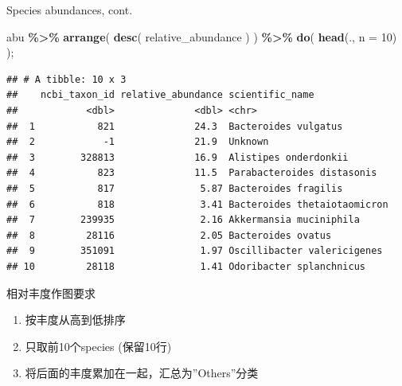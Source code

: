 \documentclass[ignorenonframetext,]{beamer}
\newenvironment{Shaded}{\begin{snugshade}}{\end{snugshade}}
\newcommand{\AttributeTok}[1]{\textcolor[rgb]{0.13,0.29,0.53}{#1}}
\newcommand{\DecValTok}[1]{\textcolor[rgb]{0.00,0.00,0.81}{#1}}
\newcommand{\FunctionTok}[1]{\textcolor[rgb]{0.13,0.29,0.53}{\textbf{#1}}}
\newcommand{\NormalTok}[1]{#1}
\newcommand{\SpecialCharTok}[1]{\textcolor[rgb]{0.81,0.36,0.00}{\textbf{#1}}}
\providecommand{\tightlist}{%
  \setlength{\itemsep}{0pt}\setlength{\parskip}{0pt}}
\newcommand\FontSmall{\fontsize{7}{8}\selectfont}
\begin{document}
\begin{frame}[fragile]{Species abundances, cont.}
\protect\hypertarget{species-abundances-cont.}{}
\FontSmall

\begin{Shaded}
\begin{Highlighting}[]
\NormalTok{abu }\SpecialCharTok{\%\textgreater{}\%} \FunctionTok{arrange}\NormalTok{( }\FunctionTok{desc}\NormalTok{( relative\_abundance ) ) }\SpecialCharTok{\%\textgreater{}\%} \FunctionTok{do}\NormalTok{( }\FunctionTok{head}\NormalTok{(., }\AttributeTok{n =} \DecValTok{10}\NormalTok{) );}
\end{Highlighting}
\end{Shaded}

\begin{verbatim}
## # A tibble: 10 x 3
##    ncbi_taxon_id relative_abundance scientific_name             
##            <dbl>              <dbl> <chr>                       
##  1           821              24.3  Bacteroides vulgatus        
##  2            -1              21.9  Unknown                     
##  3        328813              16.9  Alistipes onderdonkii       
##  4           823              11.5  Parabacteroides distasonis  
##  5           817               5.87 Bacteroides fragilis        
##  6           818               3.41 Bacteroides thetaiotaomicron
##  7        239935               2.16 Akkermansia muciniphila     
##  8         28116               2.05 Bacteroides ovatus          
##  9        351091               1.97 Oscillibacter valericigenes 
## 10         28118               1.41 Odoribacter splanchnicus
\end{verbatim}
\end{frame}

\begin{frame}{相对丰度作图要求}
\protect\hypertarget{ux76f8ux5bf9ux4e30ux5ea6ux4f5cux56feux8981ux6c42}{}
\begin{enumerate}
\tightlist
\item
  按丰度从高到低排序
\item
  只取前10个species (保留10行)
\item
  将后面的丰度累加在一起，汇总为''Others''分类
\end{enumerate}
\end{frame}
\end{document}
